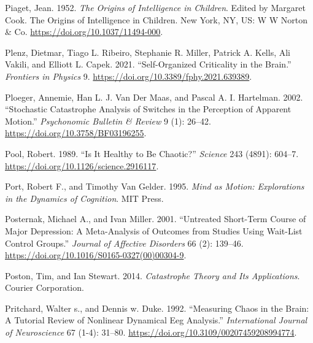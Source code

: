 \documentclass[
  letterpaper,
]{scrbook}
\newlength{\cslhangindent}
\newlength{\cslentryspacingunit} %
\newenvironment{CSLReferences}[2] %
 {%
  \setlength{\parindent}{0pt}
  \ifodd #1
  \let\oldpar\par
  \def\par{\hangindent=\cslhangindent\oldpar}
  \fi
  \setlength{\parskip}{#2\cslentryspacingunit}
 }%
 {}
\begin{document}
\begin{CSLReferences}{1}{0}
\leavevmode{}%
Piaget, Jean. 1952. \emph{The Origins of Intelligence in Children}.
Edited by Margaret Cook. The Origins of Intelligence in Children. {New
York, NY, US}: {W W Norton \& Co}.
\url{https://doi.org/10.1037/11494-000}.

\leavevmode{}%
Plenz, Dietmar, Tiago L. Ribeiro, Stephanie R. Miller, Patrick A. Kells,
Ali Vakili, and Elliott L. Capek. 2021. {``Self-{Organized Criticality}
in the {Brain}.''} \emph{Frontiers in Physics} 9.
\url{https://doi.org/10.3389/fphy.2021.639389}.

\leavevmode{}%
Ploeger, Annemie, Han L. J. Van Der Maas, and Pascal A. I. Hartelman.
2002. {``Stochastic Catastrophe Analysis of Switches in the Perception
of Apparent Motion.''} \emph{Psychonomic Bulletin \& Review} 9 (1):
26--42. \url{https://doi.org/10.3758/BF03196255}.

\leavevmode{}%
Pool, Robert. 1989. {``Is {It Healthy} to {Be Chaotic}?''}
\emph{Science} 243 (4891): 604--7.
\url{https://doi.org/10.1126/science.2916117}.

\leavevmode{}%
Port, Robert F., and Timothy Van Gelder. 1995. \emph{Mind as {Motion}:
{Explorations} in the {Dynamics} of {Cognition}}. {MIT Press}.

\leavevmode{}%
Posternak, Michael A., and Ivan Miller. 2001. {``Untreated Short-Term
Course of Major Depression: A Meta-Analysis of Outcomes from Studies
Using Wait-List Control Groups.''} \emph{Journal of Affective Disorders}
66 (2): 139--46. \url{https://doi.org/10.1016/S0165-0327(00)00304-9}.

\leavevmode{}%
Poston, Tim, and Ian Stewart. 2014. \emph{Catastrophe {Theory} and {Its
Applications}}. {Courier Corporation}.

\leavevmode{}%
Pritchard, Walter s., and Dennis w. Duke. 1992. {``Measuring {Chaos} in
the {Brain}: {A Tutorial Review} of {Nonlinear Dynamical Eeg
Analysis}.''} \emph{International Journal of Neuroscience} 67 (1-4):
31--80. \url{https://doi.org/10.3109/00207459208994774}.


\end{CSLReferences}
\end{document}
